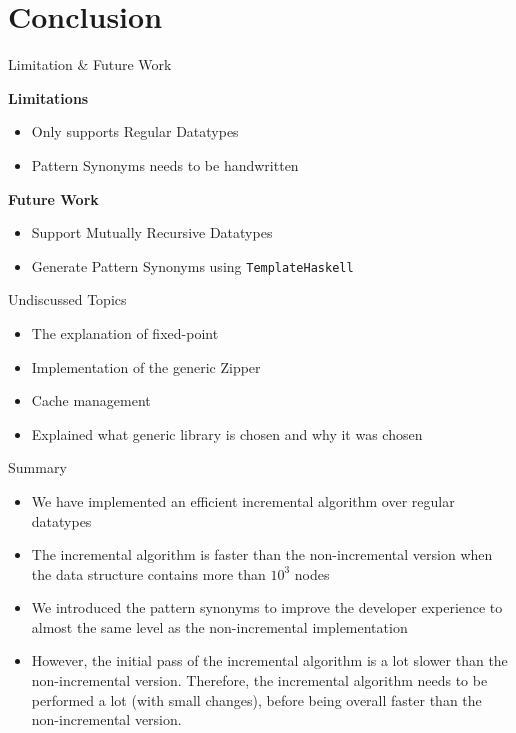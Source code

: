 \section{Conclusion}

\begin{slide}{Limitation \& Future Work}

\textbf{Limitations}

\begin{itemize}
  \item Only supports Regular Datatypes
  \item Pattern Synonyms needs to be handwritten
\end{itemize}  

\textbf{Future Work}

\begin{itemize}
  \item Support Mutually Recursive Datatypes
  \item Generate Pattern Synonyms using \texttt{TemplateHaskell}
\end{itemize}
\end{slide}

\begin{slide}{Undiscussed Topics}
\begin{itemize}
  \setlength\itemsep{.7em}
  \item The explanation of fixed-point
  \item Implementation of the generic Zipper
  \item Cache management
  \item Explained what generic library is chosen and why it was chosen
\end{itemize}
\end{slide}

\begin{slide}{Summary}
\begin{itemize}
  \setlength\itemsep{1em}
  \item We have implemented an efficient incremental algorithm over regular datatypes
  \item The incremental algorithm is faster than the non-incremental version when the data structure contains more than $10^3$ nodes
  \item We introduced the pattern synonyms to improve the developer experience to almost the same
  level as the non-incremental implementation
  \item However, the initial pass of the incremental algorithm is a lot slower than the non-incremental version. Therefore, the incremental algorithm needs to be performed a lot (with small changes), before being overall faster than the non-incremental version.
\end{itemize}
\end{slide}